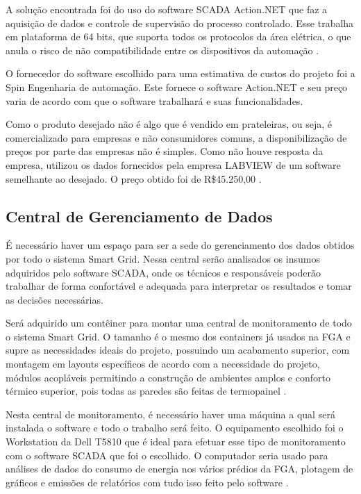 A solução encontrada foi do uso do software SCADA Action.NET que faz a aquisição de dados e controle de supervisão do processo controlado. Esse trabalha em plataforma de 64 bits, que suporta todos os protocolos da área elétrica, o que anula o risco de não compatibilidade entre os dispositivos da automação \cite{6}.

O fornecedor do software escolhido para uma estimativa de custos do projeto foi a Spin Engenharia de automação. Este fornece o software Action.NET e seu preço varia de acordo com que o software trabalhará e suas funcionalidades.

Como o produto desejado não é algo que é vendido em prateleiras, ou seja, é comercializado para empresas e não consumidores comuns, a disponibilização de preços por parte das empresas não é simples. Como não houve resposta da empresa, utilizou os dados fornecidos pela empresa LABVIEW de um software semelhante ao desejado. O preço obtido foi de R\$45.250,00 \cite{7}.

\subsection{Central de Gerenciamento de Dados}
É necessário haver um espaço para ser a sede do gerenciamento dos dados obtidos por todo o sistema Smart Grid. Nessa central serão analisados os insumos adquiridos pelo software SCADA, onde os técnicos e responsáveis poderão trabalhar de forma confortável e adequada para interpretar os resultados e tomar as decisões necessárias. 

Será adquirido um contêiner para montar uma central de monitoramento de todo o sistema Smart Grid. O tamanho é o mesmo dos containers já usados na FGA e supre as necessidades ideais do projeto, possuindo um acabamento superior, com montagem em layouts específicos de acordo com a necessidade do projeto, módulos acopláveis permitindo a construção de ambientes amplos e conforto térmico superior, pois todas as paredes são feitas de termopainel \cite{8}. 

Nesta central de monitoramento, é necessário haver uma máquina a qual será instalada o software e todo o trabalho será feito. O equipamento escolhido foi o Workstation da Dell T5810 que é ideal para efetuar esse tipo de monitoramento com o software SCADA que foi o escolhido. O computador seria usado para análises de dados do consumo de energia nos vários prédios da FGA, plotagem de gráficos e emissões de relatórios com tudo isso feito pelo software \cite{9}.

